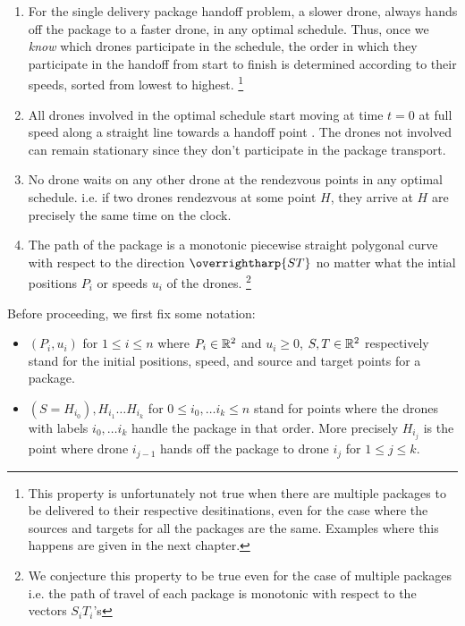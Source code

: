 \documentclass[10.0pt]{report}
\begin{document}
\begin{flem}

\begin{enumerate}

   \item  For the single delivery package handoff problem,  a slower drone, 
          always hands off the package to a faster drone, in any optimal schedule. 
          Thus, once we \textit{know} which drones participate in the schedule, the order in which they participate in the handoff
          from start to finish is determined according to their speeds, sorted from lowest to highest. 
\footnote{This property is unfortunately 
not true when there are multiple packages to be delivered to their respective desitinations, even for the case where the sources
and targets for all the packages are the same. Examples where this happens are given in the next chapter.}
   
    \item All drones involved in the optimal schedule start moving at time $t=0$ at full speed along a straight line towards a handoff point . The drones not involved 
          can remain stationary since they don't participate in the package transport. 
    
    \item No drone waits on any other drone at the rendezvous points in any optimal schedule. i.e. if two drones rendezvous at some 
          point $H$, they arrive at $H$ are precisely the same time on the clock. 

    \item The path of the package is a monotonic piecewise straight polygonal curve with respect to the direction $\overrightharp{ST}$
          no matter what the intial positions $P_i$ or speeds $u_i$ of the drones. \footnote{We conjecture this property to be true 
          even for the case of multiple packages i.e. the path of travel of each package is monotonic with respect to the vectors $S_i T_i$'s}
\end{enumerate}


 \end{flem}


Before proceeding, we first fix some notation: 

\begin{itemize}
\item $(P_i, u_i)$ for $1 \leq i \leq n$ where $P_i \in \mathbb{R}^2$ and $u_i \geq 0$, $S,T \in \mathbb{R}^2$ respectively stand for the initial positions, speed, and source and target points for a package. 
\item $(S=H_{i_0}), H_{i_1} \ldots H_{i_k}$ for $0 \leq i_0, \ldots i_k \leq n$ stand for points where the drones with labels $i_0, \ldots i_k$ handle the package in that order. More precisely 
      $H_{i_j}$ is the point where drone $i_{j-1}$ hands off the package to drone $i_j$ for $1 \leq j \leq k$.  
\end{itemize}
\end{document}
